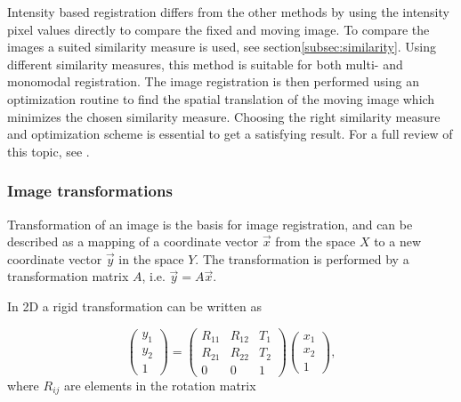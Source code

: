 Intensity based registration differs from the other methods by using the intensity pixel values directly to compare the fixed and moving image. To compare the images a suited similarity measure is used, see section\ref{subsec:similarity}. Using different similarity measures, this method is suitable for both multi- and monomodal registration. The image registration is then performed using an optimization routine to find the spatial translation of the moving image which minimizes the chosen similarity measure. Choosing the right similarity measure and optimization scheme is essential to get a satisfying result. For a full review of this topic, see \cite{Maintz1998}.

%

\subsubsection{Image transformations}

Transformation of an image is the basis for image registration, and can be described as a mapping of a coordinate vector $\vec{x}$ from the space $X$ to a new coordinate vector $\vec{y}$ in the space $Y$. The transformation is performed by a transformation matrix $A$, i.e. $\vec{y} = A\vec{x}$.

In 2D a rigid transformation can be written as 

\begin{equation}
	\label{rigid}
	\begin{pmatrix}
		y_1 \\
		y_2 \\
		1 
	\end{pmatrix}
	=
	\begin{pmatrix}
		R_{11} & R_{12} & T_1\\
		R_{21} & R_{22} & T_2\\		
		0 & 0 & 1
	\end{pmatrix}
	\begin{pmatrix}
		x_1\\
		x_2\\
		1
	\end{pmatrix},
\end{equation}
where $R_{ij}$ are elements in the rotation matrix 

